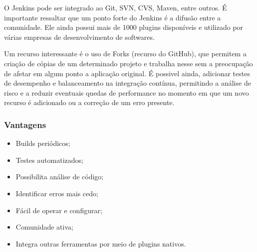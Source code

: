 O Jenkins pode ser integrado ao Git, SVN, CVS, Maven, entre outros. É importante ressaltar que um ponto forte do Jenkins é a difusão entre a comunidade. Ele ainda possui mais de 1000 plugins disponíveis e utilizado por várias empresas de desenvolvimento de softwares.

Um recurso interessante é o uso de Forks (recurso do GitHub), que permitem a criação de cópias de um determinado projeto e trabalha nesse sem a preocupação de afetar em algum ponto a aplicação original. É possivel ainda, adicionar testes de desempenho e balanceamento na integração contínua, permitindo a análise de risco e a reduzir eventuais quedas de performance no momento em que um novo recurso é adicionado ou a correção de um erro presente.

\subsubsection{Vantagens}
\begin{itemize}
\item Builds periódicos;
\item Testes automatizados;
\item Possibilita análise de código;
\item Identificar erros mais cedo;
\item Fácil de operar e configurar;
\item Comunidade ativa;
\item Integra outras ferramentas por meio de plugins nativos.
\end{itemize}


